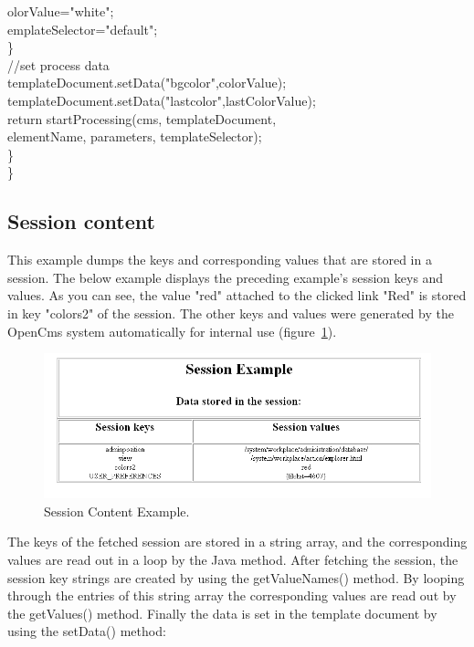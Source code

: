 \begin{java}
\jtabe                        olorValue="white";\\
\jtabe                        emplateSelector="default";\\
\jtabb        \}\\
\jtabb        //set process data\\
\jtabb        templateDocument.setData("bgcolor",colorValue);\\
\jtabb        templateDocument.setData("lastcolor",lastColorValue);\\
return startProcessing(cms, templateDocument,\\
elementName, parameters, templateSelector);\\
\}\\
\}\\
\end{java}

\subsection {Session content}

This example dumps the keys and corresponding values that are stored in
a session. The below example displays the preceding example's session
keys and values. As you can see, the value "red" attached to the clicked
link "Red" is stored in key "colors2" of the session. The other keys and
values were generated by the OpenCms system automatically for internal
use (figure~\ref{SessionExample3}).

\begin{figure}
\begin{center}
\includegraphics[clip,width=\sgw]{pics/modules/36}
\end{center}
\caption[Session Content Example]{Session Content Example.}
\label{SessionExample3}
\end{figure}

The keys of the fetched session are stored in a string array, and the
corresponding values are read out in a loop by the Java method. After
fetching the session, the session key strings are created by using the
{\meth getValueNames()} method. By looping through the entries of this string
array the corresponding values are read out by the {\meth getValues()} method.
Finally the data is set in the template document by using the {\name setData()}
method:

